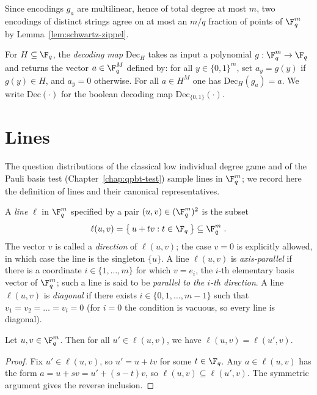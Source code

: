 Since encodings $g_a$ are multilinear, hence of total degree at most $m$, two
encodings of distinct strings agree on at most an $m/q$ fraction of points of
$\F_q^m$ by Lemma~\ref{lem:schwartz-zippel}.

\begin{definition}\label{def:decoding-map}
	\leanok
	For $H \subseteq \F_q$, the \emph{decoding map} $\mathrm{Dec}_H$ takes as
	input a polynomial $g : \F_q^m \to \F_q$ and returns the vector
	$a \in \F_q^M$ defined by: for all $y \in \{0,1\}^m$, set $a_y = g(y)$ if
	$g(y) \in H$, and $a_y = 0$ otherwise. For all $a \in H^M$ one has
	$\mathrm{Dec}_H(g_a) = a$. We write $\mathrm{Dec}(\cdot)$ for the boolean
	decoding map $\mathrm{Dec}_{\{0,1\}}(\cdot)$.
\end{definition}

\section{Lines}

The question distributions of the classical low individual degree game and of
the Pauli basis test (Chapter~\ref{chap:qpbt-test}) sample lines in $\F_q^m$;
we record here the definition of lines and their canonical representatives.

\begin{definition}[Lines]\label{def:line}
	A \emph{line} $\ell$ in $\F_q^m$ specified by a pair
	$(u,v) \in (\F_q^m)^2$ is the subset
	\begin{equation}\label{eq:line-set}
		\ell(u,v) = \bigl\{\, u + tv : t \in \F_q \,\bigr\} \subseteq \F_q^m\;.
	\end{equation}
	The vector $v$ is called a \emph{direction} of $\ell(u,v)$; the case $v = 0$
	is explicitly allowed, in which case the line is the singleton $\{u\}$. A
	line $\ell(u,v)$ is \emph{axis-parallel} if there is a coordinate
	$i \in \{1, \dots, m\}$ for which $v = e_i$, the $i$-th elementary basis
	vector of $\F_q^m$; such a line is said to be \emph{parallel to the $i$-th
	direction}. A line $\ell(u,v)$ is \emph{diagonal} if there exists
	$i \in \{0, 1, \dots, m-1\}$ such that $v_1 = v_2 = \dots = v_i = 0$ (for
	$i = 0$ the condition is vacuous, so every line is diagonal).
\end{definition}

\begin{proposition}\label{prop:line-equiv}
	\leanok
	Let $u, v \in \F_q^m$. Then for all $u' \in \ell(u,v)$, we have
	$\ell(u,v) = \ell(u',v)$.
\end{proposition}
\begin{proof}
	\leanok
	Fix $u' \in \ell(u,v)$, so $u' = u + tv$ for some $t \in \F_q$. Any
	$a \in \ell(u,v)$ has the form $a = u + sv = u' + (s - t)v$, so
	$\ell(u,v) \subseteq \ell(u',v)$. The symmetric argument gives the reverse
	inclusion.
\end{proof}

